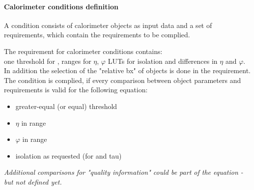 \clearpage

\paragraph{Calorimeter conditions definition}
\label{sec:gtl:calo_cond_def}

A condition consists of calorimeter objects as input data and a set of requirements, which contain the requirements to be complied.

The requirement for calorimeter conditions contains:\\
one threshold for \et, ranges for $\eta$, $\varphi$ LUTs for isolation and differences in $\eta$ and $\varphi$. In addition the selection of the "relative bx" of objects
is done in the requirement.\\
The condition is complied, if every comparison between object parameters and requirements is valid for the following equation:
\begin{itemize}
\item \et greater-equal (or equal) threshold
\item $\eta$ in range
\item $\varphi$ in range
\item isolation as requested (for \egamma and tau)
\end{itemize}
\textit{Additional comparisons for "quality information" could be part of the equation - but not defined yet.}

